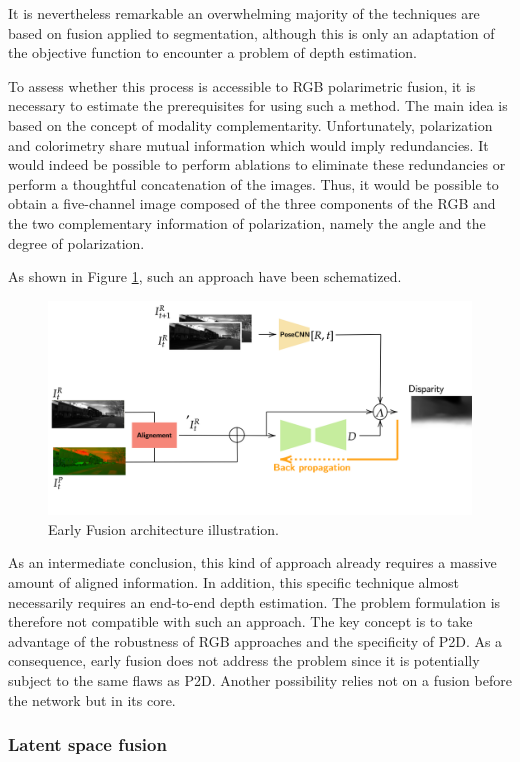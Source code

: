 It is nevertheless remarkable an overwhelming majority of the techniques are based on fusion applied to segmentation, although this is only an adaptation of the objective function to encounter a problem of depth estimation.


To assess whether this process is accessible to RGB polarimetric fusion, it is necessary to estimate the prerequisites for using such a method. The main idea is based on the concept of modality complementarity. Unfortunately, polarization and colorimetry share mutual information which would imply redundancies. It would indeed be possible to perform ablations to eliminate these redundancies or perform a thoughtful concatenation of the images. Thus, it would be possible to obtain a five-channel image composed of the three components of the RGB and the two complementary information of polarization, namely the angle and the degree of polarization. 


As shown in Figure \ref{fig:earlyf}, such an approach have been schematized.


\begin{figure}[h]
	\centering
	\includegraphics[width=0.8\linewidth]{Figures/Fusion/earlyf}
	\caption[Early Fusion architecture illustration.]{Early Fusion architecture illustration.}
	\label{fig:earlyf}
\end{figure}


As an intermediate conclusion, this kind of approach already requires a massive amount of aligned information. In addition, this specific technique almost necessarily requires an end-to-end depth estimation. The problem formulation is therefore not compatible with such an approach. The key concept is to take advantage of the robustness of RGB approaches and the specificity of P2D. As a consequence, early fusion does not address the problem since it is potentially subject to the same flaws as P2D. 
Another possibility relies not on a fusion before the network but in its core.

\subsubsection{Latent space fusion}


